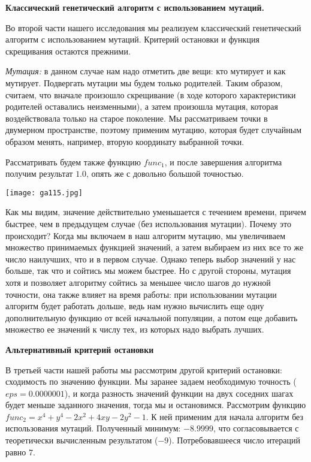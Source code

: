 \documentclass[a4paper,11pt,russian]{article}
\begin{document}
\hfill \break
\textbf{Классический генетический алгоритм с использованием мутаций. }

Во второй части нашего исследования мы реализуем классический генетический алгоритм с использованием мутаций. Критерий остановки и функция скрещивания остаются прежними.

\textit{Мутация:} в данном случае нам надо отметить две вещи: кто мутирует и как мутирует. Подвергать мутации мы будем только родителей. Таким образом, считаем, что вначале произошло скрещивание (в ходе которого характеристики родителей оставались неизменными), а затем произошла мутация, которая воздействовала только на старое поколение. Мы рассматриваем точки в двумерном пространстве, поэтому применим мутацию, которая будет случайным образом менять, например, вторую координату выбранной точки.

Рассматривать будем также функцию $func_1$, и после завершения алгоритма получим результат $1.0$, опять же с довольно большой точностью.

{\texttt{[image: ga115.jpg]}}

Как мы видим, значение действительно уменьшается с течением времени, причем быстрее, чем в предыдущем случае (без использования мутации). Почему это происходит? Когда мы включаем в наш алгоритм мутацию, мы увеличиваем множество принимаемых функцией значений, а затем выбираем из них все то же число наилучших, что и в первом случае. Однако теперь выбор значений у нас больше, так что и сойтись мы можем быстрее. Но с другой стороны, мутация хотя и позволяет алгоритму сойтись за меньшее число шагов до нужной точности, она также влияет на время работы: при использовании мутации алгоритм будет работать дольше, ведь нам нужно вычислить еще одну дополнительную функцию от всей начальной популяции, а потом еще добавить множество ее значений к числу тех, из которых надо выбрать лучших.

\hfill \break
\textbf{Альтернативный критерий остановки}

В третьей части нашей работы мы рассмотрим другой критерий остановки: сходимость по значению функции. Мы заранее задаем необходимую точность ($eps = 0.0000001$), и когда разность значений функции на двух соседних шагах будет меньше заданного значения, тогда мы и остановимся. Рассмотрим функцию $func_2 = x^4 + y^4 - 2x^2 + 4xy - 2y^2 - 1$. К ней применим для начала алгоритм без использования мутаций. Полученный минимум:  $-8.9999$, что согласовывается с теоретически вычисленным результатом ($-9$). Потребовавшееся число итераций равно $7$.
\end{document}
